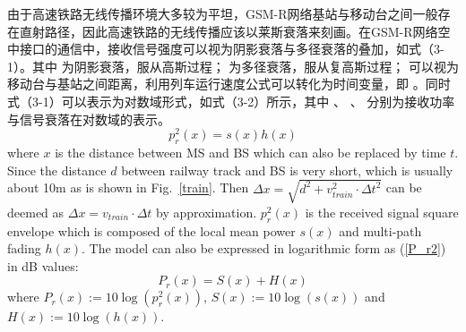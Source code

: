 \begin{figure}[!htp]
\centering
{}
    \hspace{1cm}
\hspace{1in}
\centering
{}
    \hspace{1cm}
\end{figure}

由于高速铁路无线传播环境大多较为平坦，GSM-R网络基站与移动台之间一般存在直射路径，因此高速铁路的无线传播应该以莱斯衰落来刻画。在GSM-R网络空中接口的通信中，接收信号强度可以视为阴影衰落与多径衰落的叠加，如式（3-1）。其中 为阴影衰落，服从高斯过程； 为多径衰落，服从复高斯过程； 可以视为移动台与基站之间距离，利用列车运行速度公式可以转化为时间变量，即 。同时式（3-1）可以表示为对数域形式，如式（3-2）所示，其中 、 、 分别为接收功率与信号衰落在对数域的表示。
\begin{equation}
    p_{r}^{2}(x) = s(x)h(x)
\label{p_r1}
\end{equation}
where $x$ is the distance between MS and BS which can also be replaced by time $t$. Since the distance $d$ between railway track and BS is very short, which is usually about 10m as is shown in Fig.~\ref{train}. Then $\Delta x=\sqrt{d^2+v_{train}^2\cdot \Delta t^2}$ can be deemed as $\Delta x=v_{train}\cdot \Delta t$ by approximation. $p_{r}^{2}(x)$ is the received signal square envelope which is composed of the local mean power $s(x)$ and multi-path fading $h(x)$. The model can also be expressed in logarithmic form as (\ref{P_r2}) in dB values:
\begin{equation}
P_{r}(x) = S(x) + H(x)
\label{P_r2}
\end{equation}
where $P_r(x):=10\log(p_{r}^{2}(x))$, $S(x):=10\log(s(x))$ and $H(x):=10\log(h(x))$.

